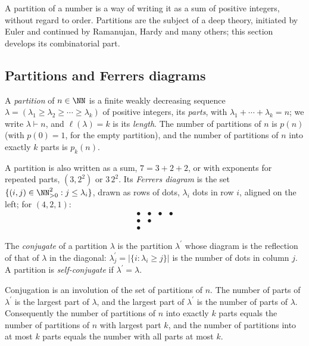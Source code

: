 A partition of a number is a way of writing it as a sum of positive integers, without regard to order. Partitions are the subject of a deep theory, initiated by Euler and continued by Ramanujan,
Hardy and many others; this section develops its combinatorial part.

\subsection{Partitions and Ferrers diagrams}\label{combinatorics:subsection-ferrers}

\begin{definition}\label{combinatorics:definition-partition}
A \emph{partition} of $n \in \NN$ is a finite weakly decreasing sequence $\lambda = (\lambda_1 \geq \lambda_2 \geq \cdots \geq \lambda_k)$ of positive integers, its \emph{parts}, with
$\lambda_1 + \cdots + \lambda_k = n$; we write $\lambda \vdash n$, and $\ell(\lambda) = k$ is its \emph{length}. The number of partitions of $n$ is $p(n)$ (with $p(0) = 1$, for the empty partition), and
the number of partitions of $n$ into exactly $k$ parts is $p_k(n)$.
\end{definition}

\begin{notation}\label{combinatorics:notation-partition}
A partition is also written as a sum, $7 = 3 + 2 + 2$, or with exponents for repeated parts, $(3, 2^2)$ or $3\,2^2$. Its \emph{Ferrers diagram} is the set
$\{(i, j) \in \NN_{>0}^2 : j \leq \lambda_i\}$, drawn as rows of dots, $\lambda_i$ dots in row $i$, aligned on the left; for $(4, 2, 1)$:
\[
\begin{array}{llll}
\bullet & \bullet & \bullet & \bullet \\
\bullet & \bullet & & \\
\bullet & & &
\end{array}
\]
\end{notation}

\begin{definition}\label{combinatorics:definition-conjugate}
The \emph{conjugate} of a partition $\lambda$ is the partition $\lambda^{\prime}$ whose diagram is the reflection of that of $\lambda$ in the diagonal: $\lambda^{\prime}_j = |\{i : \lambda_i \geq j\}|$ is the
number of dots in column $j$. A partition is \emph{self-conjugate} if $\lambda^{\prime} = \lambda$.
\end{definition}

\begin{proposition}\label{combinatorics:proposition-conjugate}
Conjugation is an involution of the set of partitions of $n$. The number of parts of $\lambda^{\prime}$ is the largest part of $\lambda$, and the largest part of $\lambda^{\prime}$ is the number of parts of
$\lambda$. Consequently the number of partitions of $n$ into exactly $k$ parts equals the number of partitions of $n$ with largest part $k$, and the number of partitions into at most $k$ parts equals the
number with all parts at most $k$.
\end{proposition}

